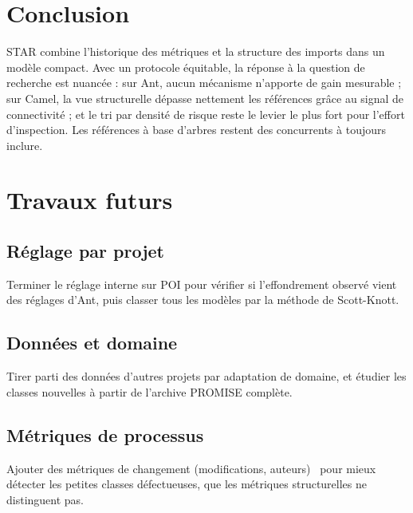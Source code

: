 \documentclass[conference,a4paper]{IEEEtran}
\newcommand{\sect}[1]{\section{\textcolor{ieeeblue}{#1}}}
\newcommand{\subsect}[1]{\subsection{\textcolor{ieeeblue}{#1}}}
\begin{document}
\sect{Conclusion}
STAR combine l'historique des métriques et la structure des imports dans un modèle compact. Avec un protocole équitable,
la réponse à la question de recherche est nuancée : sur Ant, aucun mécanisme n'apporte de gain mesurable ; sur Camel,
la vue structurelle dépasse nettement les références grâce au signal de connectivité ; et le tri par densité de risque
reste le levier le plus fort pour l'effort d'inspection. Les références à base d'arbres restent des concurrents à
toujours inclure.

\sect{Travaux futurs}
\subsect{Réglage par projet}
Terminer le réglage interne sur POI pour vérifier si l'effondrement observé vient des réglages d'Ant, puis classer tous
les modèles par la méthode de Scott-Knott.

\subsect{Données et domaine}
Tirer parti des données d'autres projets par adaptation de domaine, et étudier les classes nouvelles à partir de
l'archive PROMISE complète.

\subsect{Métriques de processus}
Ajouter des métriques de changement (modifications, auteurs)~\cite{moser2008} pour mieux détecter les petites classes
défectueuses, que les métriques structurelles ne distinguent pas.
\end{document}
